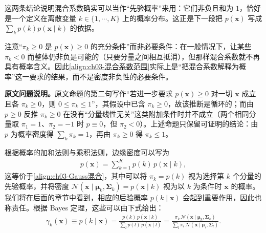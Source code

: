 \documentclass[../../main.tex]{subfiles}
\begin{document}
\begin{remark}
这两条结论说明混合系数确实可以当作“先验概率”来用：它们非负且和为 $1$，恰好是一个定义在离散变量 $k\in\{1,\cdots,K\}$ 上的概率分布。这正是下一段把 $p(\boldsymbol{x})$ 写成 $\sum_k p(k)p(\boldsymbol{x}\mid k)$ 的依据。

注意“$\pi_k\geqslant0$ 是 $p(\boldsymbol{x})\geqslant0$ 的充分条件”而非必要条件：在一般情况下，让某些 $\pi_k<0$ 而整体仍非负是可能的（只要分量之间相互抵消），但那样混合系数就不再具有概率含义。因此\eqref{align:ch03-混合系数范围}实际上是“把混合系数解释为概率”这一要求的结果，而不是密度非负性的必要条件。

\textbf{原文问题说明。}原文命题的第二句写作“若进一步要求 $p(\boldsymbol{x})\geqslant0$ 对一切 $\boldsymbol{x}$ 成立且各 $\pi_k\geqslant0$，则 $0\leqslant\pi_k\leqslant1$”，其假设中已含 $\pi_k\geqslant0$，故该推断是循环的；而由 $p\geqslant0$ 反推 $\pi_k\geqslant0$ 在没有“分量线性无关”这类附加条件时并不成立（两个相同分量取 $\pi_1=1$、$\pi_2=-1$ 时 $p\equiv0$，但 $\pi_2<0$）。上述命题只保留可证明的结论：由 $p$ 为概率密度得 $\sum_k\pi_k=1$，再由 $\pi_k\geqslant0$ 得 $\pi_k\leqslant1$。
\end{remark}

根据概率的加和法则与乘积法则，边缘密度可以写为
\begin{align}
p(\boldsymbol{x})=\sum_{k=1}^{K}p(k)\,p(\boldsymbol{x}\mid k),
\label{align:ch03-混合生成式}
\end{align}
这等价于\eqref{align:ch03-Gauss混合}，其中可以将 $\pi_{k}=p(k)$ 视为选择第 $k$ 个分量的先验概率，并将密度 $\mathcal{N}(\boldsymbol{x}\mid\boldsymbol{\mu}_{k},\boldsymbol{\Sigma}_{k})=p(\boldsymbol{x}\mid k)$ 视为以 $k$ 为条件时 $\boldsymbol{x}$ 的概率。我们将在后面的章节中看到，相应的后验概率 $p(k\mid\boldsymbol{x})$ 会起到重要作用，因此也称责任。根据 Bayes 定理，这些可以由下式给出：
\begin{align}
\gamma_{k}(\boldsymbol{x})\equiv p(k\mid\boldsymbol{x})=\frac{p(k)\,p(\boldsymbol{x}\mid k)}{\sum_{l}p(l)\,p(\boldsymbol{x}\mid l)}=\frac{\pi_{k}\,\mathcal{N}(\boldsymbol{x}\mid\boldsymbol{\mu}_{k},\boldsymbol{\Sigma}_{k})}{\sum_{l}\pi_{l}\,\mathcal{N}(\boldsymbol{x}\mid\boldsymbol{\mu}_{l},\boldsymbol{\Sigma}_{l})}.
\label{align:ch03-责任}
\end{align}
\end{document}
